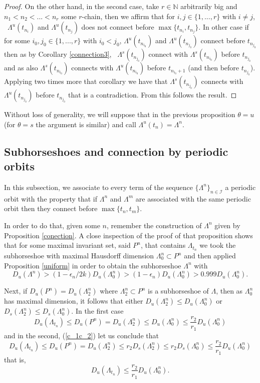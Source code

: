 \documentclass[12pt]{amsart}
\theoremstyle{plain} %
\theoremstyle{definition} %
\numberwithin{equation}{section}
\begin{document}
\begin{proof}
On the other hand, in the second case, take $r\in \mathbb{N}$ arbitrarily big and $n_1< n_2 <... <n_r$ some $r$-chain, then we affirm that for $i,j\in  \{1,...,r \}$ with $i\neq j$, \ $\Lambda^u(t_{n_i})$ and $\Lambda^u(t_{n_j})$ does not connect before $\max \{ t_{n_i}, t_{n_j} \}.$ In other case if for some $i_0,j_0\in  \{1,...,r \}$ with $i_0 < j_0$, $\Lambda^u(t_{n_{i_0}})$ and $\Lambda^u(t_{n_{j_0}})$ connect before $t_{n_{j_0}}$ then as by Corollary \ref{connection3}, \ $\Lambda^s(t_{n_{j_0}})$ connect with $\Lambda^s(t_{n_{i_0}})$ before $t_{n_{j_0}}$ and as also $\Lambda^s(t_{n_{i_0}})$ connects with $\Lambda^u(t_{n_{i_0}})$ before $t_{n_{i_0}+1}$ (and then before $t_{n_{j_0}}$). Applying two times more that corollary we have that $\Lambda^s(t_{n_{j_0}})$ connects with $\Lambda^u(t_{n_{j_0}})$ before $t_{n_{j_0}}$ that is a contradiction. From this follows the result.
 \end{proof}
 
Without loss of generality, we will suppose that in the previous proposition $\theta=u$ (for $\theta=s$ the argument is similar) and call $\Lambda^u(t_n)=\Lambda^n$. 

\subsection{Subhorseshoes and connection by periodic orbits}
In this subsection, we associate to every term of the sequence $\{\Lambda^n\}_{n\in\mathcal{I}}$ a periodic orbit with the property that if $\Lambda^n$ and $\Lambda^m$ are associated with the same periodic orbit then they connect before $\max \{t_n,t_m\}$.

In order to do that, given some $n$, remember the construction of $\Lambda^n$ given by Proposition \ref{conection}. A close inspection of the proof of that proposition shows that for some maximal invariant set, said $P^n$, that contains $\Lambda_{t_n}$ we took the subhorseshoe with maximal Hausdorff dimension $\Lambda_0^n\subset P^n$ and then applied Proposition \ref{uniform} in order to obtain the subhorseshoe $\Lambda^n$ with
\begin{equation}\label{estima1}
D_u(\Lambda^n)>(1-\epsilon_n/2k)D_u(\Lambda_0^n)>(1-\epsilon_n)D_u(\Lambda_0^n)>0.999D_u(\Lambda_0^n).
\end{equation}


Next, if $D_u(P^n)=D_u(\Lambda_2^n)$ where $\Lambda_2^n\subset P^n$ is a subhorseshoe of $\Lambda$, then as $\Lambda_0^n$ has maximal dimension, it follows that either $D_u(\Lambda_2^n)\leq D_u(\Lambda_0^n)$ or $D_s(\Lambda_2^n)\leq D_s(\Lambda_0^n)$. In the first case 
$$D_u(\Lambda_{t_n})\leq D_u(P^n)=D_u(\Lambda_2^n)\leq D_u(\Lambda_0^n)\leq \frac{r_2}{r_1}D_u(\Lambda_0^n)$$
and in the second, (\ref{c_1c_2}) let us conclude that $$ D_u(\Lambda_{t_n})\leq D_u(P^n)=D_u(\Lambda_2^n)\leq r_2D_s(\Lambda_2^n)\leq r_2D_s(\Lambda_0^n)\leq \frac{r_2}{r_1}D_u(\Lambda_0^n)$$ that is,
\begin{equation}\label{estima2}
  D_u(\Lambda_{t_n}) \leq \frac{r_2}{r_1}D_u(\Lambda_0^n).
\end{equation}
\end{document}
